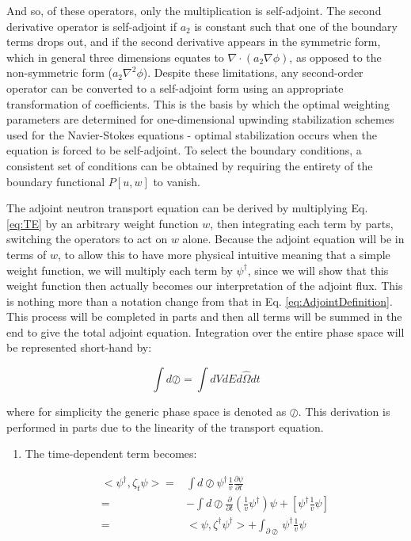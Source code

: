 \documentclass[10pt]{article}
\newcommand{\hO}{\hat{\Omega}}
\begin{document}
\begin{flushleft}
\begin{tcolorbox}[breakable]
And so, of these operators, only the multiplication is self-adjoint. The second derivative operator is self-adjoint if \(a_2\) is constant such that one of the boundary terms drops out, and if the second derivative appears in the symmetric form, which in general three dimensions equates to \(\nabla\cdot(a_2\nabla \phi)\), as opposed to the non-symmetric form (\(a_2\nabla^2 \phi\)). Despite these limitations, any second-order operator can be converted to a self-adjoint form using an appropriate transformation of coefficients. This is the basis by which the optimal weighting parameters are determined for one-dimensional upwinding stabilization schemes used for the Navier-Stokes equations - optimal stabilization occurs when the equation is forced to be self-adjoint. To select the boundary conditions, a consistent set of conditions can be obtained by requiring the entirety of the boundary functional \(P[u,w]\) to vanish. 
\end{tcolorbox}

The adjoint neutron transport equation can be derived by multiplying Eq. \ref{eq:TE} by an arbitrary weight function \(w\), then integrating each term by parts, switching the operators to act on \(w\) alone. Because the adjoint equation will be in terms of \(w\), to allow this to have more physical intuitive meaning that a simple weight function, we will multiply each term by \(\psi^\dagger\), since we will show that this weight function then actually becomes our interpretation of the adjoint flux. This is nothing more than a notation change from that in Eq. \ref{eq:AdjointDefinition}. This process will be completed in parts and then all terms will be summed in the end to give the total adjoint equation. Integration over the entire phase space will be represented short-hand by:

\begin{equation}
\label{eq:PhaseSpaceIntegration}
\int d\oslash = \int dVdEd\hO  dt
\end{equation}

where for simplicity the generic phase space is denoted as \(\oslash\). This derivation is performed in parts due to the linearity of the transport equation.

\begin{enumerate}
\item The time-dependent term becomes:

\begin{equation}
\label{eq:AdjointTime}
\begin{aligned}
<\psi^\dagger, \zeta_t\psi> = & \int d\oslash \psi^\dagger \frac{1}{v} \frac{\partial\psi}{\partial t}\\
= & -\int d\oslash \frac{\partial}{\partial t} \left(\frac{1}{v}\psi^\dagger\right)\psi + [\psi^\dagger \frac{1}{v} \psi]\\
= & <\psi, \zeta^\dagger\psi^\dagger> + \int_{\partial\oslash}\psi^\dagger \frac{1}{v} \psi
\end{aligned}
\end{equation}


\end{enumerate}
\end{flushleft}
\end{document}
